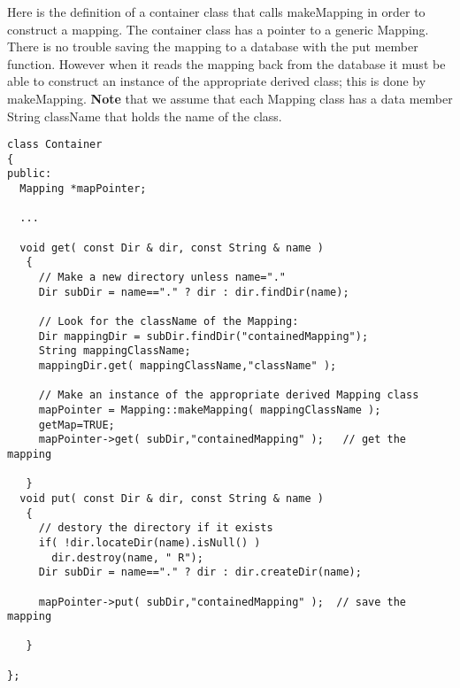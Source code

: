 \documentclass[xcolor=rgb,svgnames,dvipsnames]{article}
\begin{document}
Here is the definition of a container class that calls {\ff makeMapping}
in order to construct a mapping. The container class has a pointer
to a generic Mapping. There is no trouble saving the mapping to
a database with the {\ff put} member function. However when it 
reads the mapping back from the database it must be able to
construct an instance of the appropriate derived class; this is
done by {\ff makeMapping}. {\bf Note} that we assume that each Mapping
class has a data member {\ff String className} that holds the name
of the class.
{\footnotesize
\begin{verbatim}
class Container
{ 
public:
  Mapping *mapPointer;

  ...

  void get( const Dir & dir, const String & name )
   {
     // Make a new directory unless name="."
     Dir subDir = name=="." ? dir : dir.findDir(name);

     // Look for the className of the Mapping:
     Dir mappingDir = subDir.findDir("containedMapping");
     String mappingClassName;
     mappingDir.get( mappingClassName,"className" );

     // Make an instance of the appropriate derived Mapping class
     mapPointer = Mapping::makeMapping( mappingClassName );
     getMap=TRUE;
     mapPointer->get( subDir,"containedMapping" );   // get the mapping

   }
  void put( const Dir & dir, const String & name )
   {  
     // destory the directory if it exists
     if( !dir.locateDir(name).isNull() )
       dir.destroy(name, " R");
     Dir subDir = name=="." ? dir : dir.createDir(name);

     mapPointer->put( subDir,"containedMapping" );  // save the mapping

   }

};

\end{verbatim}
}


%
%
\end{document}
